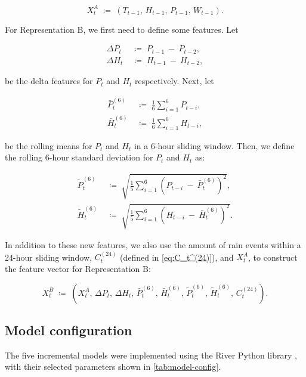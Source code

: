 \documentclass[11pt,a4paper]{article}
\begin{document}
	\begin{equation}
		X_t^A \;\coloneqq\; \left(T_{t-1},\,H_{t-1},\,P_{t-1},\,W_{t-1}\right).
	\end{equation}
	
	For Representation B, we first need to define some features. Let
	
	\begin{align}
		\Delta P_t &\;\coloneqq\; P_{t-1} \:-\: P_{t-2}, \\
		\Delta H_t &\;\coloneqq\; H_{t-1} \:-\: H_{t-2},
	\end{align}
	
	be the delta features for $P_t$ and $H_t$ respectively. Next, let
	
	\begin{align}
		\bar{P}_t^{(6)} &\;\coloneqq\; \frac{1}{6} \sum_{i=1}^{6} P_{t-i}, \\
		\bar{H}_t^{(6)} &\;\coloneqq\; \frac{1}{6} \sum_{i=1}^{6} H_{t-i},
	\end{align}
	
	be the rolling means for $P_t$ and $H_t$ in a 6-hour sliding window. Then, we define the rolling 6-hour standard deviation for $P_t$ and $H_t$ as:
	
	\begin{align}
		\tilde{P}_t^{(6)} &\;\coloneqq\; \sqrt{\frac{1}{5} \sum_{i=1}^{6} \left(P_{t-i} \:-\: \bar{P}_t^{(6)}\right)^2}, \\
		\tilde{H}_t^{(6)} &\;\coloneqq\; \sqrt{\frac{1}{5} \sum_{i=1}^{6} \left(H_{t-i} \:-\: \bar{H}_t^{(6)}\right)^2}.
	\end{align}
	
	In addition to these new features, we also use the amount of rain events within a 24-hour sliding window, $C_t^{(24)}$ (defined in \autoref{eq:C_t^(24)}), and $X_t^A$, to construct the feature vector for Representation B:
	
	\begin{equation}
		X_t^B \;\coloneqq\; \left(X_{t}^A,\, \Delta P_t,\, \Delta H_t,\, \bar{P}_t^{(6)},\, \bar{H}_t^{(6)},\, \tilde{P}_t^{(6)},\, \tilde{H}_t^{(6)},\, C^{(24)}_{t}\right).
	\end{equation}
	
	\subsection{Model configuration}
	
	The five incremental models were implemented using the River Python library \parencite{river}, with their selected parameters shown in \autoref{tab:model-config}.
	
\end{document}

